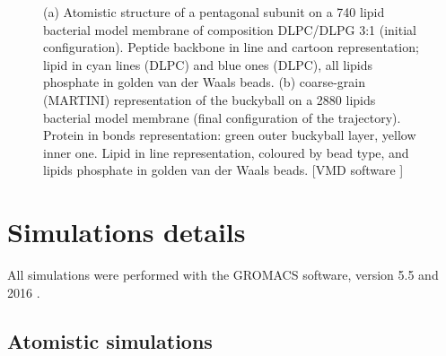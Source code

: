 \begin{figure}[t]
\centering
{}
\caption[Snapshot of simulations of capzip on model membranes]{(a) Atomistic structure of a pentagonal subunit on a 740 lipid bacterial model membrane of composition DLPC/DLPG 3:1 (initial configuration). Peptide backbone in line and cartoon representation; lipid in cyan lines (DLPC) and blue ones (DLPC), all lipids phosphate in golden van der Waals beads. (b) coarse-grain (MARTINI) representation of the buckyball on a 2880 lipids bacterial model membrane (final configuration of the trajectory). Protein in bonds representation: green outer buckyball layer, yellow inner one. Lipid in line representation, coloured by bead type, and lipids phosphate in golden van der Waals beads. [VMD software \citet{HUMP96}]}
\label{fig:pL6_vmd}
\end{figure}
\section{Simulations details} \label{sec:details}

All simulations were performed with the GROMACS software, version 5.5 and 2016 \citep{Berendsen1995,Abraham2015,gromacs_man}. 

\subsection{Atomistic simulations}
